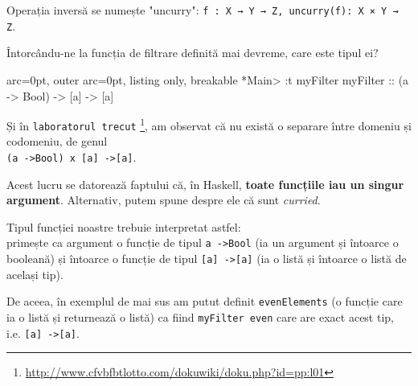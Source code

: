 Operația inversă se numește "uncurry": \texttt{f : X → Y → Z,   uncurry(f): X × Y → Z}.

Întorcându-ne la funcția de filtrare definită mai devreme, care este tipul ei?


\begin{tcblisting}{ arc=0pt, outer arc=0pt, listing only, breakable}
*Main> :t myFilter
myFilter :: (a -> Bool) -> [a] -> [a]

\end{tcblisting}


Și în \texttt{laboratorul trecut} \footnote{\url{http://www.cfvbfbtlotto.com/dokuwiki/doku.php?id=pp:l01}}, am observat că nu există o separare între domeniu și codomeniu, de genul\\\texttt{(a -\textgreater  Bool) x [a] -\textgreater  [a]}.

\begin{tcolorbox}[colback=yellow!40, colframe=yellow!60, breakable]
Acest lucru se datorează faptului că, în Haskell, \textbf{toate funcțiile iau un singur argument}. Alternativ, putem spune despre ele că sunt \textit{curried}.

Tipul funcției noastre trebuie interpretat astfel:\\primește ca argument o funcție de tipul \texttt{a -\textgreater  Bool} (ia un argument și întoarce o booleană) și întoarce o funcție de tipul \texttt{[a] -\textgreater  [a]} (ia o listă și întoarce o listă de același tip).

De aceea, în exemplul de mai sus am putut definit \texttt{evenElements} (o funcție care ia o listă și returnează o listă) ca fiind \texttt{myFilter even} care are exact acest tip, i.e. \texttt{[a] -\textgreater  [a]}.
\end{tcolorbox}

